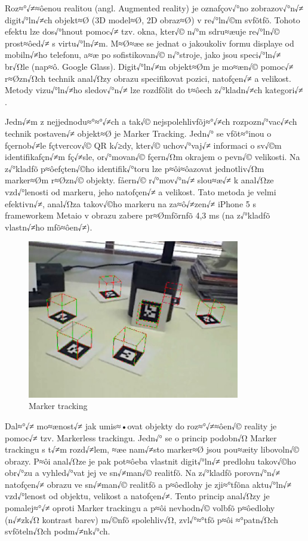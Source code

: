 \documentclass[twoside,12pt]{article}
\begin{document}
%
%

Roz≈°√≠≈ôenou realitou (angl. Augmented reality) je oznaƒçov√°no zobrazov√°n√≠ digit√°ln√≠ch objekt≈Ø (3D model≈Ø, 2D obraz≈Ø) v re√°ln√©m svƒõtƒõ. Tohoto efektu lze dos√°hnout pomoc√≠ tzv. okna, kter√© n√°m sdru≈æuje re√°ln√© prost≈ôed√≠ s virtu√°ln√≠m. M≈Ø≈æe se jednat o jakoukoliv formu displaye od mobiln√≠ho telefonu, a≈æ po sofistikovan√© n√°stroje, jako jsou speci√°ln√≠ br√Ωle (nap≈ô. Google Glass). Digit√°ln√≠m objekt≈Øm je mo≈æn√© pomoc√≠ r≈Øzn√Ωch technik anal√Ωzy obrazu specifikovat pozici, natoƒçen√≠ a velikost. Metody vizu√°ln√≠ho sledov√°n√≠ lze rozdƒõlit do t≈ôech z√°kladn√≠ch kategori√≠ \cite{klein_visual_tracking}.

Jedn√≠m z nejjednodu≈°≈°√≠ch a tak√© nejspolehlivƒõj≈°√≠ch rozpozn√°vac√≠ch technik postaven√≠ objekt≈Ø je Marker Tracking. Jedn√° se vƒõt≈°inou o ƒçernob√≠le ƒçtvercov√© QR k√≥dy, kter√© uchov√°vaj√≠ informaci o sv√©m identifikaƒçn√≠m ƒç√≠sle, or√°movan√© ƒçern√Ωm okrajem o pevn√© velikosti. Na z√°kladƒõ p≈ôeƒçten√©ho identifik√°toru lze p≈ôi≈ôazovat jednotliv√Ωm marker≈Øm r≈Øzn√© objekty. ƒåern√© r√°mov√°n√≠ slou≈æ√≠ k anal√Ωze vzd√°lenosti od markeru, jeho natoƒçen√≠ a velikost. Tato metoda je velmi efektivn√≠, anal√Ωza takov√©ho markeru na za≈ô√≠zen√≠ iPhone 5 s frameworkem Metaio v obrazu zabere pr≈Ømƒõrnƒõ 4,3 ms (na z√°kladƒõ vlastn√≠ho mƒõ≈ôen√≠).

\begin{figure}[H]
    \includegraphics[width=350px, center]{images/marker-tracking.jpg}
    \caption{Marker tracking}
    \label{marker_tracking}
\end{figure}

Dal≈°√≠ mo≈ænost√≠ jak umis≈•ovat objekty do roz≈°√≠≈ôen√© reality je pomoc√≠ tzv. Markerless trackingu. Jedn√° se o princip podobn√Ω Marker trackingu s t√≠m rozd√≠lem, ≈æe nam√≠sto marker≈Ø jsou pou≈æity libovoln√© obrazy. P≈ôi anal√Ωze je pak pot≈ôeba vlastnit digit√°ln√≠ predlohu takov√©ho obr√°zu a vyhled√°vat jej ve sn√≠man√© realitƒõ. Na z√°kladƒõ porovn√°n√≠ natoƒçen√≠ obrazu ve sn√≠man√© realitƒõ a p≈ôedlohy je zji≈°tƒõna aktu√°ln√≠ vzd√°lenost od objektu, velikost a natoƒçen√≠. Tento princip anal√Ωzy je pomalej≈°√≠ oproti Marker trackingu a p≈ôi nevhodn√© volbƒõ p≈ôedlohy (n√≠zk√Ω kontrast barev) m√©nƒõ spolehliv√Ω, zvl√°≈°tƒõ p≈ôi ≈°patn√Ωch svƒõteln√Ωch podm√≠nk√°ch.
\end{document}

